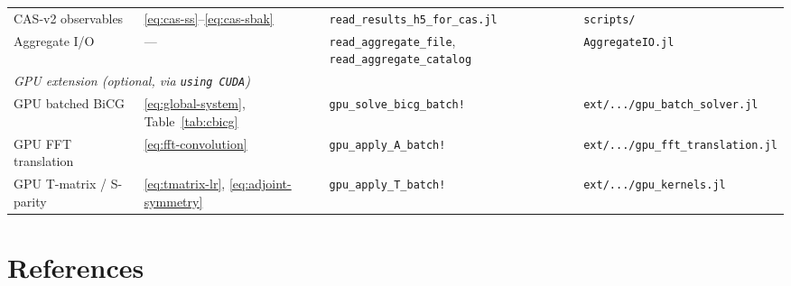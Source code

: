 \documentclass[11pt,a4paper]{article}
\begin{document}
\begin{center}
\begin{tabular}{@{} p{4.2cm} p{2.8cm} p{4.2cm} p{3.5cm} @{}}
  CAS-v2 observables & \eqref{eq:cas-ss}--\eqref{eq:cas-sbak} & \texttt{read\_results\_h5\_for\_cas.jl} & \texttt{scripts/} \\
  Aggregate I/O & --- & \texttt{read\_aggregate\_file}, \texttt{read\_aggregate\_catalog} & \texttt{AggregateIO.jl} \\
  \midrule
  \multicolumn{4}{l}{\textit{GPU extension (optional, via \texttt{using CUDA})}} \\
  GPU batched BiCG & \eqref{eq:global-system}, Table~\ref{tab:cbicg} & \texttt{gpu\_solve\_bicg\_batch!} & \texttt{ext/.../gpu\_batch\_solver.jl} \\
  GPU FFT translation & \eqref{eq:fft-convolution} & \texttt{gpu\_apply\_A\_batch!} & \texttt{ext/.../gpu\_fft\_translation.jl} \\
  GPU T-matrix / S-parity & \eqref{eq:tmatrix-lr}, \eqref{eq:adjoint-symmetry} & \texttt{gpu\_apply\_T\_batch!} & \texttt{ext/.../gpu\_kernels.jl} \\
  \bottomrule
\end{tabular}
\end{center}

\section{References}
\label{sec:references}
\end{document}
